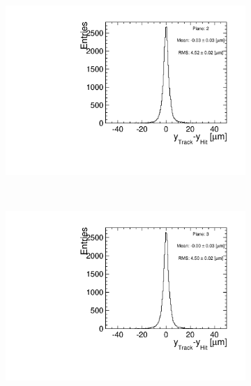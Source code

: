 \begin{figure}[htbp]
\begin{subfigure}[b]{0.3\textwidth}
    \includegraphics[width=\textwidth]{figures/Telescope/biasedResiduals/BiasedResiduals_run49_PlaneYRMS2.pdf}
    \caption{}
  \end{subfigure} \\
  \begin{subfigure}[b]{0.3\textwidth}
    \includegraphics[width=\textwidth]{figures/Telescope/biasedResiduals/BiasedResiduals_run49_PlaneYRMS3.pdf}
    \caption{}
  \end{subfigure}\hfill
  \begin{subfigure}[b]{0.3\textwidth}

\end{subfigure}
\end{figure}
